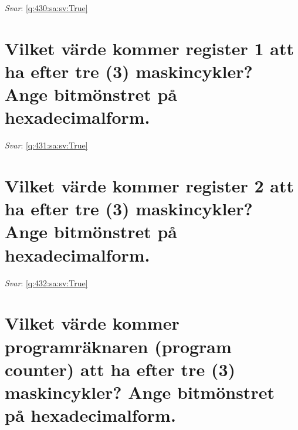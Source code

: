 \documentclass[a4paper,11pt,oneside]{book}
\begin{document}
\begin{sloppypar}
\label{q:430:sa:sv:False}

\vspace{2cm}

\noindent\makebox[\textwidth]{\hrulefill}

\vspace{1cm}

\textit{Svar}: \autoref{q:430:sa:sv:True}



\section{Vilket v\"arde kommer register 1 att ha efter tre (3) maskincykler? Ange bitm\"onstret p\r{a} hexadecimalform.}

\label{q:431:sa:sv:False}

\vspace{2cm}

\noindent\makebox[\textwidth]{\hrulefill}

\vspace{1cm}

\textit{Svar}: \autoref{q:431:sa:sv:True}



\section{Vilket v\"arde kommer register 2 att ha efter tre (3) maskincykler? Ange bitm\"onstret p\r{a} hexadecimalform.}

\label{q:432:sa:sv:False}

\vspace{2cm}

\noindent\makebox[\textwidth]{\hrulefill}

\vspace{1cm}

\textit{Svar}: \autoref{q:432:sa:sv:True}



\section{Vilket v\"arde kommer programr\"aknaren (program counter) att ha efter tre (3) maskincykler? Ange bitm\"onstret p\r{a} hexadecimalform.}

\label{q:433:sa:sv:False}

\vspace{2cm}

\noindent\makebox[\textwidth]{\hrulefill}


\end{sloppypar}
\end{document}
